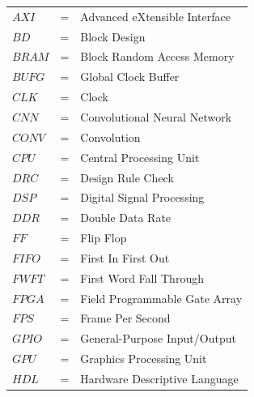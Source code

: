 \begin{tabular}{llp{3in}}
    $AXI$   & \hspace{1.5cm} = & Advanced eXtensible Interface \\
    $BD$    & \hspace{1.5cm} = & Block Design \\
    $BRAM$  & \hspace{1.5cm} = & Block Random Access Memory \\
    $BUFG$  & \hspace{1.5cm} = & Global Clock Buffer \\
    $CLK$   & \hspace{1.5cm} = & Clock \\
    $CNN$   & \hspace{1.5cm} = & Convolutional Neural Network \\
    $CONV$  & \hspace{1.5cm} = & Convolution \\
    $CPU$   & \hspace{1.5cm} = & Central Processing Unit \\
    $DRC$   & \hspace{1.5cm} = & Design Rule Check \\
    $DSP$   & \hspace{1.5cm} = & Digital Signal Processing \\
    $DDR$   & \hspace{1.5cm} = & Double Data Rate \\
    $FF$    & \hspace{1.5cm} = & Flip Flop \\
    $FIFO$  & \hspace{1.5cm} = & First In First Out \\
    $FWFT$  & \hspace{1.5cm} = & First Word Fall Through \\
    $FPGA$  & \hspace{1.5cm} = & Field Programmable Gate Array \\
    $FPS$   & \hspace{1.5cm} = & Frame Per Second \\
    $GPIO$  & \hspace{1.5cm} = & General-Purpose Input/Output \\
    $GPU$   & \hspace{1.5cm} = & Graphics Processing Unit \\
    $HDL$   & \hspace{1.5cm} = & Hardware Descriptive Language \\

\end{tabular}
